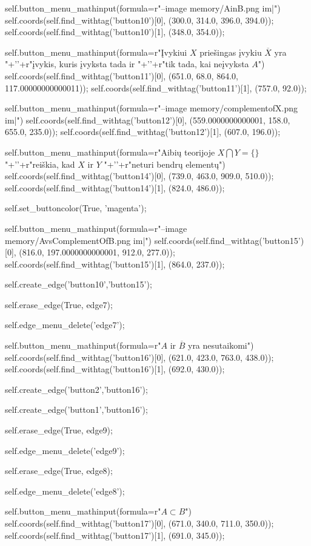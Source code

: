 self.button_menu_mathinput(formula=r"--image memory/AinB.png im|")
self.coords(self.find_withtag('button10')[0], (300.0, 314.0, 396.0, 394.0));
self.coords(self.find_withtag('button10')[1], (348.0, 354.0));

self.button_menu_mathinput(formula=r"Įvykiui $X$ priešingas įvykiu $\overline{X}$ yra "+'\n'+r"įvykis, kuris įvyksta tada ir "+'\n'+r"tik tada, kai neįvyksta $A$")
self.coords(self.find_withtag('button11')[0], (651.0, 68.0, 864.0, 117.00000000000011));
self.coords(self.find_withtag('button11')[1], (757.0, 92.0));

self.button_menu_mathinput(formula=r"--image memory/complementofX.png im|")
self.coords(self.find_withtag('button12')[0], (559.0000000000001, 158.0, 655.0, 235.0));
self.coords(self.find_withtag('button12')[1], (607.0, 196.0));


self.button_menu_mathinput(formula=r"Aibių teorijoje $X\bigcap Y=\{\}$"+'\n'+r"reiškia, kad $X$ ir $Y$ "+'\n'+r"neturi bendrų elementų")
self.coords(self.find_withtag('button14')[0], (739.0, 463.0, 909.0, 510.0));
self.coords(self.find_withtag('button14')[1], (824.0, 486.0));

self.set_buttoncolor(True, 'magenta');

self.button_menu_mathinput(formula=r"--image memory/AvsComplementOfB.png im|")
self.coords(self.find_withtag('button15')[0], (816.0, 197.0000000000001, 912.0, 277.0));
self.coords(self.find_withtag('button15')[1], (864.0, 237.0));

self.create_edge('button10','button15');

self.erase_edge(True, edge7);

self.edge_menu_delete('edge7');

self.button_menu_mathinput(formula=r"$A$ ir $\overline{B}$ yra nesutaikomi")
self.coords(self.find_withtag('button16')[0], (621.0, 423.0, 763.0, 438.0));
self.coords(self.find_withtag('button16')[1], (692.0, 430.0));

self.create_edge('button2','button16');

self.create_edge('button1','button16');

self.erase_edge(True, edge9);

self.edge_menu_delete('edge9');

self.erase_edge(True, edge8);

self.edge_menu_delete('edge8');


self.button_menu_mathinput(formula=r"$A \subset B$")
self.coords(self.find_withtag('button17')[0], (671.0, 340.0, 711.0, 350.0));
self.coords(self.find_withtag('button17')[1], (691.0, 345.0));

